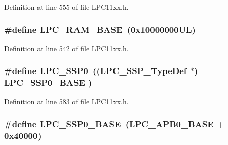 Definition at line 555 of file L\+P\+C11xx.\+h.

\subsubsection[{\texorpdfstring{L\+P\+C\+\_\+\+R\+A\+M\+\_\+\+B\+A\+SE}{LPC_RAM_BASE}}]{\setlength{\rightskip}{0pt plus 5cm}\#define L\+P\+C\+\_\+\+R\+A\+M\+\_\+\+B\+A\+SE~(0x10000000\+U\+L)}\hypertarget{group___l_p_c11xx___definitions_ga9782814ad6434f200b65440d2ac01c2a}{}\label{group___l_p_c11xx___definitions_ga9782814ad6434f200b65440d2ac01c2a}


Definition at line 542 of file L\+P\+C11xx.\+h.

\subsubsection[{\texorpdfstring{L\+P\+C\+\_\+\+S\+S\+P0}{LPC_SSP0}}]{\setlength{\rightskip}{0pt plus 5cm}\#define L\+P\+C\+\_\+\+S\+S\+P0~(({\bf L\+P\+C\+\_\+\+S\+S\+P\+\_\+\+Type\+Def}    $\ast$) {\bf L\+P\+C\+\_\+\+S\+S\+P0\+\_\+\+B\+A\+SE}  )}\hypertarget{group___l_p_c11xx___definitions_gac213e0325a8e8a972bd2e0dd6ccf353c}{}\label{group___l_p_c11xx___definitions_gac213e0325a8e8a972bd2e0dd6ccf353c}


Definition at line 583 of file L\+P\+C11xx.\+h.

\subsubsection[{\texorpdfstring{L\+P\+C\+\_\+\+S\+S\+P0\+\_\+\+B\+A\+SE}{LPC_SSP0_BASE}}]{\setlength{\rightskip}{0pt plus 5cm}\#define L\+P\+C\+\_\+\+S\+S\+P0\+\_\+\+B\+A\+SE~({\bf L\+P\+C\+\_\+\+A\+P\+B0\+\_\+\+B\+A\+SE} + 0x40000)}\hypertarget{group___l_p_c11xx___definitions_ga53fb1af80b541545988f2a966681abfd}{}\label{group___l_p_c11xx___definitions_ga53fb1af80b541545988f2a966681abfd}


